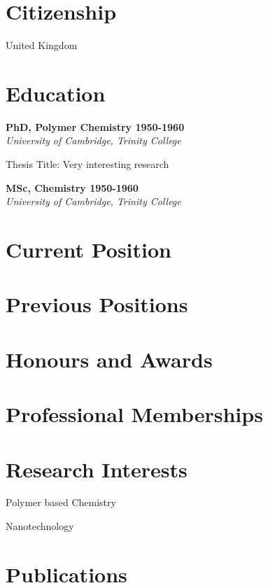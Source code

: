 \section{Citizenship}                           
United Kingdom

\section{Education}
\textbf{PhD, Polymer Chemistry
\hfill 1950-1960}\\
{\em University of Cambridge, Trinity College}

Thesis Title: {Very interesting research}

\vspace{3pt}
\textbf{MSc, Chemistry
\hfill 1950-1960}\\
{\em University of Cambridge, Trinity College}

\section{Current Position}

\section{Previous Positions}

\section{Honours and Awards}

\section{Professional Memberships}

\section{Research Interests}
\begin{innerlist}
    \item Polymer based Chemistry
    \item Nanotechnology
\end{innerlist}

\section{Publications}


